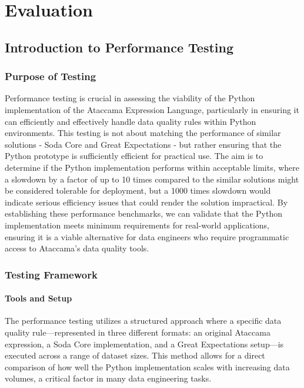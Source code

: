 
\chapter{Evaluation}

\section{Introduction to Performance Testing}

\subsection{Purpose of Testing}

Performance testing is crucial in assessing the viability of the Python implementation of the Ataccama Expression Language, particularly in ensuring it can efficiently and effectively handle data quality rules within Python environments. This testing is not about matching the performance of similar solutions - Soda Core and Great Expectations -  but rather ensuring that the Python prototype is sufficiently efficient for practical use. The aim is to determine if the Python implementation performs within acceptable limits, where a slowdown by a factor of up to 10 times compared to the similar solutions might be considered tolerable for deployment, but a 1000 times slowdown would indicate serious efficiency issues that could render the solution impractical. By establishing these performance benchmarks, we can validate that the Python implementation meets minimum requirements for real-world applications, ensuring it is a viable alternative for data engineers who require programmatic access to Ataccama's data quality tools.

\subsection{Testing Framework}

\subsubsection{Tools and Setup}

The performance testing utilizes a structured approach where a specific data quality rule—represented in three different formats: an original Ataccama expression, a Soda Core implementation, and a Great Expectations setup—is executed across a range of dataset sizes. This method allows for a direct comparison of how well the Python implementation scales with increasing data volumes, a critical factor in many data engineering tasks.

